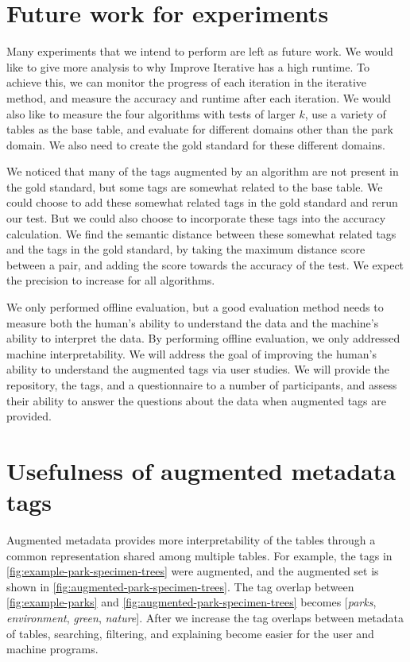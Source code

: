 \section{Future work for experiments}
\label{sec:FutureWorkForExperiments}

Many experiments that we intend to perform are left as future work. We would like to give more analysis to why Improve Iterative has a high runtime. To achieve this, we can monitor the progress of each iteration in the iterative method, and measure the accuracy and runtime after each iteration. We would also like to measure the four algorithms with tests of larger $k$, use a variety of tables as the base table, and evaluate for different domains other than the park domain. We also need to create the gold standard for these different domains.

We noticed that many of the tags augmented by an algorithm are not present in the gold standard, but some tags are somewhat related to the base table. We could choose to add these somewhat related tags in the gold standard and rerun our test. But we could also choose to incorporate these tags into the accuracy calculation. We find the semantic distance between these somewhat related tags and the tags in the gold standard, by taking the maximum distance score between a pair, and adding the score towards the accuracy of the test. We expect the precision to increase for all algorithms.

We only performed offline evaluation, but a good evaluation method needs to measure both the human's ability to understand the data and the machine's ability to interpret the data. By performing offline evaluation, we only addressed machine interpretability. We will address the goal of improving the human's ability to understand the augmented tags via user studies. We will provide the repository, the tags, and a questionnaire to a number of participants, and assess their ability to answer the questions about the data when augmented tags are provided.

\section{Usefulness of augmented metadata tags}
\label{sec:UsefulnessOfAugmentedMetadataTags}

Augmented metadata provides more interpretability of the tables through a common representation shared among multiple tables. For example, the tags in \autoref{fig:example-park-specimen-trees} were augmented, and the augmented set is shown in \autoref{fig:augmented-park-specimen-trees}. The tag overlap between \autoref{fig:example-parks} and \autoref{fig:augmented-park-specimen-trees} becomes [\textit{parks}, \textit{environment}, \textit{green}, \textit{nature}]. After we increase the tag overlaps between metadata of tables, searching, filtering, and explaining become easier for the user and machine programs.


